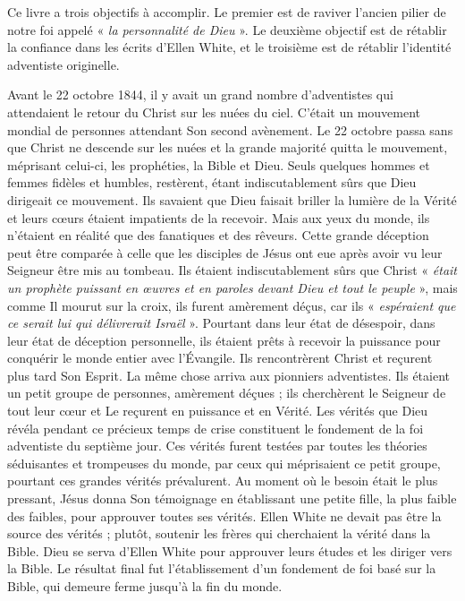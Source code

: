 

Ce livre a trois objectifs à accomplir. Le premier est de raviver l'ancien pilier de notre foi appelé « \textit{la personnalité de Dieu} ». Le deuxième objectif est de rétablir la confiance dans les écrits d'Ellen White, et le troisième est de rétablir l'identité adventiste originelle.

Avant le 22 octobre 1844, il y avait un grand nombre d'adventistes qui attendaient le retour du Christ sur les nuées du ciel. C'était un mouvement mondial de personnes attendant Son second avènement. Le 22 octobre passa sans que Christ ne descende sur les nuées et la grande majorité quitta le mouvement, méprisant celui-ci, les prophéties, la Bible et Dieu. Seuls quelques hommes et femmes fidèles et humbles, restèrent, étant indiscutablement sûrs que Dieu dirigeait ce mouvement. Ils savaient que Dieu faisait briller la lumière de la Vérité et leurs cœurs étaient impatients de la recevoir. Mais aux yeux du monde, ils n'étaient en réalité que des fanatiques et des rêveurs. Cette grande déception peut être comparée à celle que les disciples de Jésus ont eue après avoir vu leur Seigneur être mis au tombeau. Ils étaient indiscutablement sûrs que Christ « \textit{était un prophète puissant en œuvres et en paroles devant Dieu et tout le peuple} », mais comme Il mourut sur la croix, ils furent amèrement déçus, car ils « \textit{espéraient que ce serait lui qui délivrerait Israël} ». Pourtant dans leur état de désespoir, dans leur état de déception personnelle, ils étaient prêts à recevoir la puissance pour conquérir le monde entier avec l'Évangile. Ils rencontrèrent Christ et reçurent plus tard Son Esprit. La même chose arriva aux pionniers adventistes. Ils étaient un petit groupe de personnes, amèrement déçues ; ils cherchèrent le Seigneur de tout leur cœur et Le reçurent en puissance et en Vérité. Les vérités que Dieu révéla pendant ce précieux temps de crise constituent le fondement de la foi adventiste du septième jour. Ces vérités furent testées par toutes les théories séduisantes et trompeuses du monde, par ceux qui méprisaient ce petit groupe, pourtant ces grandes vérités prévalurent. Au moment où le besoin était le plus pressant, Jésus donna Son témoignage en établissant une petite fille, la plus faible des faibles, pour approuver toutes ses vérités. Ellen White ne devait pas être la source des vérités ; plutôt, soutenir les frères qui cherchaient la vérité dans la Bible. Dieu se serva d'Ellen White pour approuver leurs études et les diriger vers la Bible. Le résultat final fut l'établissement d'un fondement de foi basé sur la Bible, qui demeure ferme jusqu'à la fin du monde.

